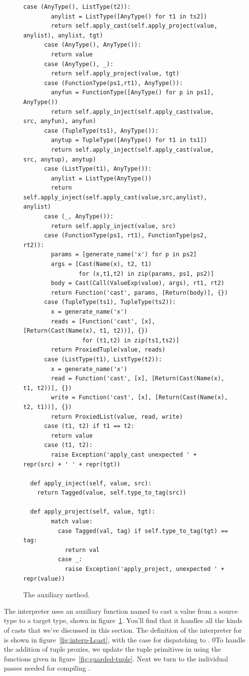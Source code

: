 \documentclass[7x10]{TimesAPriori_MIT}%
\def\racketEd{0}
\def\edition{1}
\newcommand{\racket}[1]{{\if\edition\racketEd{#1}\fi}}
\numberwithin{theorem}{chapter}
\numberwithin{definition}{chapter}
\numberwithin{equation}{chapter}
\begin{document}
\begin{figure}[tbp]
\begin{tcolorbox}[colback=white]
{\begin{lstlisting}[basicstyle=\ttfamily\footnotesize]
      case (AnyType(), ListType(t2)):
        anylist = ListType([AnyType() for t1 in ts2])
        return self.apply_cast(self.apply_project(value, anylist), anylist, tgt)
      case (AnyType(), AnyType()):
        return value
      case (AnyType(), _):
        return self.apply_project(value, tgt)
      case (FunctionType(ps1,rt1), AnyType()):
        anyfun = FunctionType([AnyType() for p in ps1], AnyType())
        return self.apply_inject(self.apply_cast(value, src, anyfun), anyfun)
      case (TupleType(ts1), AnyType()):
        anytup = TupleType([AnyType() for t1 in ts1])
        return self.apply_inject(self.apply_cast(value, src, anytup), anytup)
      case (ListType(t1), AnyType()):
        anylist = ListType(AnyType())
        return self.apply_inject(self.apply_cast(value,src,anylist), anylist)
      case (_, AnyType()):
        return self.apply_inject(value, src)
      case (FunctionType(ps1, rt1), FunctionType(ps2, rt2)):
        params = [generate_name('x') for p in ps2]
        args = [Cast(Name(x), t2, t1)
                for (x,t1,t2) in zip(params, ps1, ps2)]
        body = Cast(Call(ValueExp(value), args), rt1, rt2)
        return Function('cast', params, [Return(body)], {})
      case (TupleType(ts1), TupleType(ts2)):
        x = generate_name('x')
        reads = [Function('cast', [x], [Return(Cast(Name(x), t1, t2))], {})
                 for (t1,t2) in zip(ts1,ts2)]
        return ProxiedTuple(value, reads)
      case (ListType(t1), ListType(t2)):
        x = generate_name('x')
        read = Function('cast', [x], [Return(Cast(Name(x), t1, t2))], {})
        write = Function('cast', [x], [Return(Cast(Name(x), t2, t1))], {})
        return ProxiedList(value, read, write)
      case (t1, t2) if t1 == t2:
        return value
      case (t1, t2):
        raise Exception('apply_cast unexpected ' + repr(src) + ' ' + repr(tgt))

  def apply_inject(self, value, src):
    return Tagged(value, self.type_to_tag(src))

  def apply_project(self, value, tgt):
        match value:
          case Tagged(val, tag) if self.type_to_tag(tgt) == tag:
            return val
          case _:
            raise Exception('apply_project, unexpected ' + repr(value))
\end{lstlisting}
\fi}
\end{tcolorbox}
\caption{The  auxiliary method.}
  \label{fig:apply_cast}
\end{figure}

The \LangCast{} interpreter uses an auxiliary function named
 to cast a value from a source type to a target type,
shown in figure~\ref{fig:apply_cast}. You'll find that it handles all
the kinds of casts that we've discussed in this section.
%
The definition of the interpreter for \LangCast{} is shown in
figure~\ref{fig:interp-Lcast}, with the case for 
dispatching to .
\racket{To handle the addition of tuple
proxies, we update the tuple primitives in \code{interp-op} using the
functions given in figure~\ref{fig:guarded-tuple}.}
Next we turn to the individual passes needed for compiling \LangGrad{}.
\end{document}
